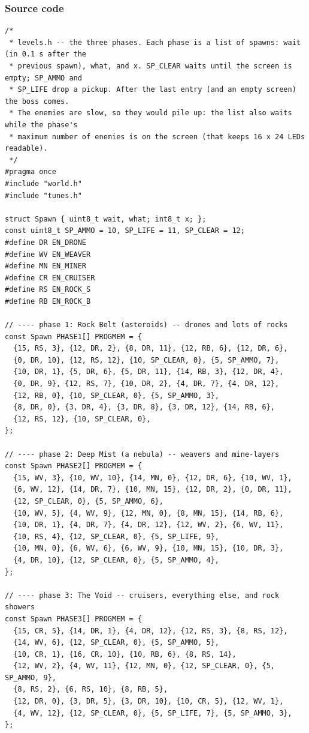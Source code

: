 \documentclass[11pt,a4paper]{article}
\begin{document}
\subsubsection*{Source code}
\begin{lstlisting}[language=Arduino]
/*
 * levels.h -- the three phases. Each phase is a list of spawns: wait (in 0.1 s after the
 * previous spawn), what, and x. SP_CLEAR waits until the screen is empty; SP_AMMO and
 * SP_LIFE drop a pickup. After the last entry (and an empty screen) the boss comes.
 * The enemies are slow, so they would pile up: the list also waits while the phase's
 * maximum number of enemies is on the screen (that keeps 16 x 24 LEDs readable).
 */
#pragma once
#include "world.h"
#include "tunes.h"

struct Spawn { uint8_t wait, what; int8_t x; };
const uint8_t SP_AMMO = 10, SP_LIFE = 11, SP_CLEAR = 12;
#define DR EN_DRONE
#define WV EN_WEAVER
#define MN EN_MINER
#define CR EN_CRUISER
#define RS EN_ROCK_S
#define RB EN_ROCK_B

// ---- phase 1: Rock Belt (asteroids) -- drones and lots of rocks
const Spawn PHASE1[] PROGMEM = {
  {15, RS, 3}, {12, DR, 2}, {8, DR, 11}, {12, RB, 6}, {12, DR, 6},
  {0, DR, 10}, {12, RS, 12}, {10, SP_CLEAR, 0}, {5, SP_AMMO, 7},
  {10, DR, 1}, {5, DR, 6}, {5, DR, 11}, {14, RB, 3}, {12, DR, 4},
  {0, DR, 9}, {12, RS, 7}, {10, DR, 2}, {4, DR, 7}, {4, DR, 12},
  {12, RB, 0}, {10, SP_CLEAR, 0}, {5, SP_AMMO, 3},
  {8, DR, 0}, {3, DR, 4}, {3, DR, 8}, {3, DR, 12}, {14, RB, 6},
  {12, RS, 12}, {10, SP_CLEAR, 0},
};

// ---- phase 2: Deep Mist (a nebula) -- weavers and mine-layers
const Spawn PHASE2[] PROGMEM = {
  {15, WV, 3}, {10, WV, 10}, {14, MN, 0}, {12, DR, 6}, {10, WV, 1},
  {6, WV, 12}, {14, DR, 7}, {10, MN, 15}, {12, DR, 2}, {0, DR, 11},
  {12, SP_CLEAR, 0}, {5, SP_AMMO, 6},
  {10, WV, 5}, {4, WV, 9}, {12, MN, 0}, {8, MN, 15}, {14, RB, 6},
  {10, DR, 1}, {4, DR, 7}, {4, DR, 12}, {12, WV, 2}, {6, WV, 11},
  {10, RS, 4}, {12, SP_CLEAR, 0}, {5, SP_LIFE, 9},
  {10, MN, 0}, {6, WV, 6}, {6, WV, 9}, {10, MN, 15}, {10, DR, 3},
  {4, DR, 10}, {12, SP_CLEAR, 0}, {5, SP_AMMO, 4},
};

// ---- phase 3: The Void -- cruisers, everything else, and rock showers
const Spawn PHASE3[] PROGMEM = {
  {15, CR, 5}, {14, DR, 1}, {4, DR, 12}, {12, RS, 3}, {8, RS, 12},
  {14, WV, 6}, {12, SP_CLEAR, 0}, {5, SP_AMMO, 5},
  {10, CR, 1}, {16, CR, 10}, {10, RB, 6}, {8, RS, 14},
  {12, WV, 2}, {4, WV, 11}, {12, MN, 0}, {12, SP_CLEAR, 0}, {5, SP_AMMO, 9},
  {8, RS, 2}, {6, RS, 10}, {8, RB, 5},
  {12, DR, 0}, {3, DR, 5}, {3, DR, 10}, {10, CR, 5}, {12, WV, 1},
  {4, WV, 12}, {12, SP_CLEAR, 0}, {5, SP_LIFE, 7}, {5, SP_AMMO, 3},
};


\end{lstlisting}
\end{document}
